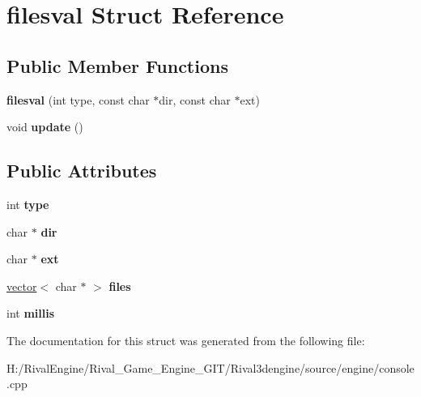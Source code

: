 \hypertarget{structfilesval}{}\section{filesval Struct Reference}
\label{structfilesval}
\subsection*{Public Member Functions}
\begin{DoxyCompactItemize}
\item 
\mbox{\label{structfilesval_a3608a268ddda5107b2c89b69fe22db15}} 
{\bfseries filesval} (int type, const char $\ast$dir, const char $\ast$ext)
\item 
\mbox{\label{structfilesval_a57f2725d4798e3b82d58fbabcf73b861}} 
void {\bfseries update} ()
\end{DoxyCompactItemize}
\subsection*{Public Attributes}
\begin{DoxyCompactItemize}
\item 
\mbox{\label{structfilesval_ad29dc1cdb726d32c8f044356bd4729aa}} 
int {\bfseries type}
\item 
\mbox{\label{structfilesval_ab7666251a3e02d8998af92fe3724618f}} 
char $\ast$ {\bfseries dir}
\item 
\mbox{\label{structfilesval_a50dad30e727231aaec4031b30cec43bf}} 
char $\ast$ {\bfseries ext}
\item 
\mbox{\label{structfilesval_a6db4a4f76467c311e63c3536ae2909f6}} 
\hyperlink{structvector}{vector}$<$ char $\ast$ $>$ {\bfseries files}
\item 
\mbox{\label{structfilesval_a9697721fe8b96856f46212dbbeec1d74}} 
int {\bfseries millis}
\end{DoxyCompactItemize}


The documentation for this struct was generated from the following file\+:\begin{DoxyCompactItemize}
\item 
H\+:/\+Rival\+Engine/\+Rival\+\_\+\+Game\+\_\+\+Engine\+\_\+\+G\+I\+T/\+Rival3dengine/source/engine/console.\+cpp\end{DoxyCompactItemize}
